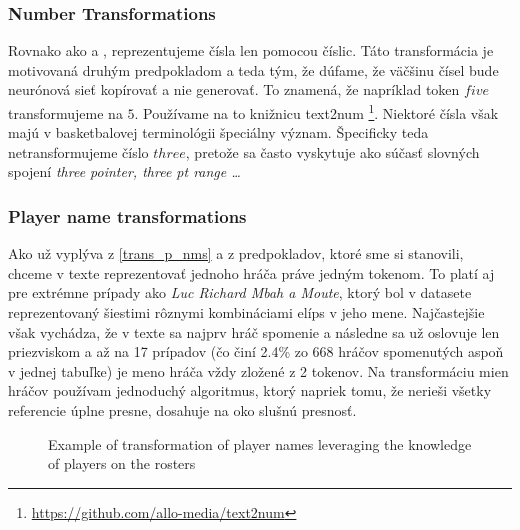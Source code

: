 \subsubsection{Number Transformations} \label{num_trans_rw}

Rovnako ako \citep{wiseman2017} a \citep{puduppully2019datatotext}, reprezentujeme čísla len pomocou číslic. Táto transformácia je motivovaná druhým predpokladom a teda tým, že dúfame, že väčšinu čísel bude neurónová sieť kopírovať a nie generovať. To znamená, že napríklad token $five$ transformujeme na $5$. Používame na to knižnicu text2num \footnote[1]{\url{https://github.com/allo-media/text2num}}. Niektoré čísla však majú v basketbalovej terminológii špeciálny význam. Špecificky teda netransformujeme číslo $three$, pretože sa často vyskytuje ako súčasť slovných spojení \emph{three pointer, three pt range \dots}

\subsubsection{Player name transformations}

Ako už vyplýva z \ref{trans_p_nms} a z predpokladov, ktoré sme si stanovili, chceme v texte reprezentovať jednoho hráča práve jedným tokenom. To platí aj pre extrémne prípady ako \emph{Luc Richard Mbah a Moute}, ktorý bol v datasete reprezentovaný šiestimi rôznymi kombináciami elíps v jeho mene. Najčastejšie však vychádza, že v texte sa najprv hráč spomenie a následne sa už oslovuje len priezviskom a až na 17 prípadov (čo činí 2.4\% zo 668 hráčov spomenutých aspoň v jednej tabuľke) je meno hráča vždy zložené z 2 tokenov. Na transformáciu mien hráčov používam jednoduchý algoritmus, ktorý napriek tomu, že nerieši všetky referencie úplne presne, dosahuje na oko slušnú presnosť.

\begin{figure}[!h]
\centering
\usetikzlibrary{shapes.multipart}
\caption{Example of transformation of player names leveraging the knowledge of players on the rosters} \label{cmp_original_vs_mine}
\end{figure}

